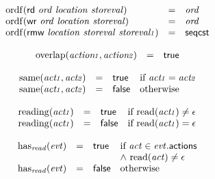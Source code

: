 $$
\begin{array}[t]{@{}lcl@{}l@{}}
{\mathrm{ordf}}(\mathsf{rd}~{\mathit{ord}}~{\mathit{location}}~{\mathit{storeval}}) & = & {\mathit{ord}} \\
{\mathrm{ordf}}(\mathsf{wr}~{\mathit{ord}}~{\mathit{location}}~{\mathit{storeval}}) & = & {\mathit{ord}} \\
{\mathrm{ordf}}(\mathsf{rmw}~{\mathit{location}}~{\mathit{storeval}}~{\mathit{storeval{\kern-0.1em\scriptstyle 1}}}) & = & \mathsf{seqcst} \\
\end{array}
$$

$$
\begin{array}[t]{@{}lcl@{}l@{}}
{\mathrm{overlap}}({\mathit{action{\kern-0.1em\scriptstyle 1}}}, {\mathit{action{\kern-0.1em\scriptstyle 2}}}) & = & \mathsf{true} \\
\end{array}
$$

$$
\begin{array}[t]{@{}lcl@{}l@{}}
{\mathrm{same}}({\mathit{act{\kern-0.1em\scriptstyle 1}}}, {\mathit{act{\kern-0.1em\scriptstyle 2}}}) & = & \mathsf{true} & \quad \mbox{if}~ {\mathit{act{\kern-0.1em\scriptstyle 1}}} = {\mathit{act{\kern-0.1em\scriptstyle 2}}} \\
{\mathrm{same}}({\mathit{act{\kern-0.1em\scriptstyle 1}}}, {\mathit{act{\kern-0.1em\scriptstyle 2}}}) & = & \mathsf{false} & \quad \mbox{otherwise} \\
\end{array}
$$

$$
\begin{array}[t]{@{}lcl@{}l@{}}
{\mathrm{reading}}({\mathit{act{\kern-0.1em\scriptstyle 1}}}) & = & \mathsf{true} & \quad \mbox{if}~ {\mathrm{read}}({\mathit{act{\kern-0.1em\scriptstyle 1}}}) \neq \epsilon \\
{\mathrm{reading}}({\mathit{act{\kern-0.1em\scriptstyle 1}}}) & = & \mathsf{false} & \quad \mbox{if}~ {\mathrm{read}}({\mathit{act{\kern-0.1em\scriptstyle 1}}}) = \epsilon \\
\end{array}
$$

$$
\begin{array}[t]{@{}lcl@{}l@{}}
{\mathrm{has}}_{\mathit{read}}({\mathit{evt}}) & = & \mathsf{true} & \quad
\begin{array}[t]{@{}l@{}}
\mbox{if}~ {\mathit{act}} \in {\mathit{evt}}{.}\mathsf{actions} \\
{\land}~ {\mathrm{read}}({\mathit{act}}) \neq \epsilon \\
\end{array} \\
{\mathrm{has}}_{\mathit{read}}({\mathit{evt}}) & = & \mathsf{false} & \quad \mbox{otherwise} \\
\end{array}
$$

